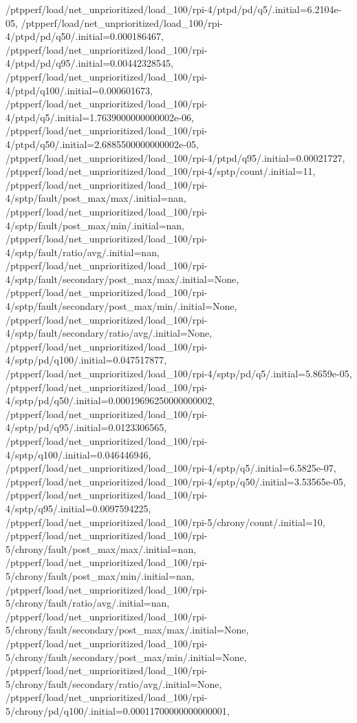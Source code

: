 {    /ptpperf/load/net_unprioritized/load_100/rpi-4/ptpd/pd/q5/.initial=6.2104e-05,
    /ptpperf/load/net_unprioritized/load_100/rpi-4/ptpd/pd/q50/.initial=0.000186467,
    /ptpperf/load/net_unprioritized/load_100/rpi-4/ptpd/pd/q95/.initial=0.00442328545,
    /ptpperf/load/net_unprioritized/load_100/rpi-4/ptpd/q100/.initial=0.000601673,
    /ptpperf/load/net_unprioritized/load_100/rpi-4/ptpd/q5/.initial=1.7639000000000002e-06,
    /ptpperf/load/net_unprioritized/load_100/rpi-4/ptpd/q50/.initial=2.6885500000000002e-05,
    /ptpperf/load/net_unprioritized/load_100/rpi-4/ptpd/q95/.initial=0.00021727,
    /ptpperf/load/net_unprioritized/load_100/rpi-4/sptp/count/.initial=11,
    /ptpperf/load/net_unprioritized/load_100/rpi-4/sptp/fault/post_max/max/.initial=nan,
    /ptpperf/load/net_unprioritized/load_100/rpi-4/sptp/fault/post_max/min/.initial=nan,
    /ptpperf/load/net_unprioritized/load_100/rpi-4/sptp/fault/ratio/avg/.initial=nan,
    /ptpperf/load/net_unprioritized/load_100/rpi-4/sptp/fault/secondary/post_max/max/.initial=None,
    /ptpperf/load/net_unprioritized/load_100/rpi-4/sptp/fault/secondary/post_max/min/.initial=None,
    /ptpperf/load/net_unprioritized/load_100/rpi-4/sptp/fault/secondary/ratio/avg/.initial=None,
    /ptpperf/load/net_unprioritized/load_100/rpi-4/sptp/pd/q100/.initial=0.047517877,
    /ptpperf/load/net_unprioritized/load_100/rpi-4/sptp/pd/q5/.initial=5.8659e-05,
    /ptpperf/load/net_unprioritized/load_100/rpi-4/sptp/pd/q50/.initial=0.00019696250000000002,
    /ptpperf/load/net_unprioritized/load_100/rpi-4/sptp/pd/q95/.initial=0.0123306565,
    /ptpperf/load/net_unprioritized/load_100/rpi-4/sptp/q100/.initial=0.046446946,
    /ptpperf/load/net_unprioritized/load_100/rpi-4/sptp/q5/.initial=6.5825e-07,
    /ptpperf/load/net_unprioritized/load_100/rpi-4/sptp/q50/.initial=3.53565e-05,
    /ptpperf/load/net_unprioritized/load_100/rpi-4/sptp/q95/.initial=0.0097594225,
    /ptpperf/load/net_unprioritized/load_100/rpi-5/chrony/count/.initial=10,
    /ptpperf/load/net_unprioritized/load_100/rpi-5/chrony/fault/post_max/max/.initial=nan,
    /ptpperf/load/net_unprioritized/load_100/rpi-5/chrony/fault/post_max/min/.initial=nan,
    /ptpperf/load/net_unprioritized/load_100/rpi-5/chrony/fault/ratio/avg/.initial=nan,
    /ptpperf/load/net_unprioritized/load_100/rpi-5/chrony/fault/secondary/post_max/max/.initial=None,
    /ptpperf/load/net_unprioritized/load_100/rpi-5/chrony/fault/secondary/post_max/min/.initial=None,
    /ptpperf/load/net_unprioritized/load_100/rpi-5/chrony/fault/secondary/ratio/avg/.initial=None,
    /ptpperf/load/net_unprioritized/load_100/rpi-5/chrony/pd/q100/.initial=0.00011700000000000001,
}
